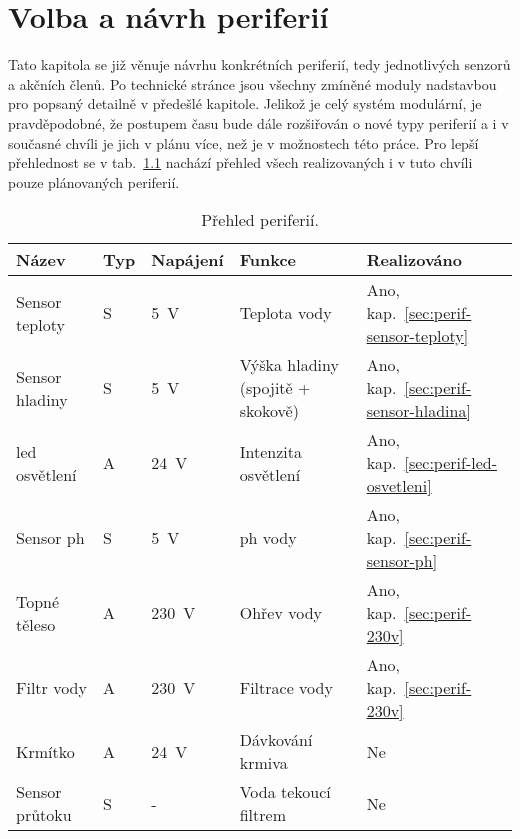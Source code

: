 \chapter{Volba a návrh periferií}
    Tato kapitola se již věnuje návrhu konkrétních periferií, tedy jednotlivých senzorů a akčních členů. Po technické stránce jsou všechny zmíněné moduly nadstavbou pro  popsaný detailně v předešlé kapitole. Jelikož je celý systém modulární, je pravděpodobné, že postupem času bude dále rozšiřován o nové typy periferií a i v současné chvíli je jich v plánu více, než je v možnostech této práce. Pro lepší přehlednost se v tab.~\ref{tab:prehled-periferii} nachází přehled všech realizovaných i v tuto chvíli pouze plánovaných periferií.

    \begin{table}[h]
        \centering
        \caption{Přehled periferií.}
        \label{tab:prehled-periferii}
        \begin{tabular}{|l|l|l|l|l|}
            \hline
            Název & Typ & Napájení & Funkce & Realizováno \\ \hline\hline
            Sensor teploty  & S & \qty{5}{V}    & Teplota vody                       & Ano, kap.~\ref{sec:perif-sensor-teploty}  \\ \hline
            Sensor hladiny  & S & \qty{5}{V}    & Výška hladiny (spojitě + skokově)  & Ano, kap.~\ref{sec:perif-sensor-hladina}  \\ \hline
            \acs{led} osvětlení   & A & \qty{24}{V}   & Intenzita osvětlení                & Ano, kap.~\ref{sec:perif-led-osvetleni}  \\ \hline
            Sensor \acs{ph}       & S & \qty{5}{V}    & \acs{ph} vody                            & Ano, kap.~\ref{sec:perif-sensor-ph}  \\ \hline
            Topné těleso    & A & \qty{230}{V}  & Ohřev vody                         & Ano, kap.~\ref{sec:perif-230v}  \\ \hline
            Filtr vody      & A & \qty{230}{V}  & Filtrace vody                      & Ano, kap.~\ref{sec:perif-230v}  \\ \hline
            Krmítko         & A & \qty{24}{V}   & Dávkování krmiva                   & Ne  \\ \hline
            Sensor průtoku  & S & -             & Voda tekoucí filtrem               & Ne  \\ \hline

\end{tabular}
\end{table}
